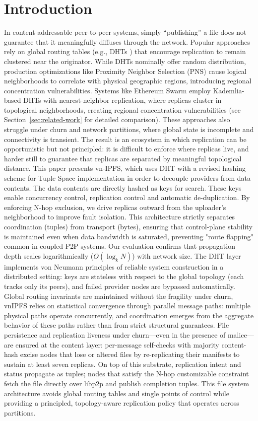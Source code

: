 \documentclass[runningheads]{llncs}
\begin{document}
\section{Introduction}
In content-addressable peer-to-peer systems, simply ``publishing'' a file does not guarantee that it meaningfully diffuses through the network. Popular approaches rely on global routing tables (e.g., DHTs \cite{StoicaChord01}) that encourage replication to remain clustered near the originator. While DHTs nominally offer random distribution, production optimizations like Proximity Neighbor Selection (PNS) cause logical neighborhoods to correlate with physical geographic regions, introducing regional concentration vulnerabilities. Systems like Ethereum Swarm employ Kademlia-based DHTs with nearest-neighbor replication, where replicas cluster in topological neighborhoods, creating regional concentration vulnerabilities (see Section~\ref{sec:related-work} for detailed comparison). These approaches also struggle under churn and network partitions, where global state is incomplete and connectivity is transient. The result is an ecosystem in which replication can be opportunistic but not principled: it is difficult to enforce where replicas live, and harder still to guarantee that replicas are separated by meaningful topological distance.
This paper presents vn-IPFS, which uses DHT with a revised hashing scheme for Tuple Space implementation in order to decouple providers from data contents. The data contents are directly hashed as keys for search. These keys enable concurrency control, replication control and automatic de-duplication. By enforcing N-hop exclusion, we drive replicas outward from the uploader's neighborhood to improve fault isolation. This architecture strictly separates coordination (tuples) from transport (bytes), ensuring that control-plane stability is maintained even when data bandwidth is saturated, preventing "route flapping" common in coupled P2P systems. Our evaluation confirms that propagation depth scales logarithmically ($O(\log_k N)$) with network size.
The DHT layer implements von Neumann principles of reliable system construction in a distributed setting: keys are stateless with respect to the global topology (each tracks only its peers), and failed provider nodes are bypassed automatically. Global routing invariants are maintained without the fragility under churn, vnIPFS relies on statistical convergence through parallel message paths: multiple physical paths operate concurrently, and coordination emerges from the aggregate behavior of these paths rather than from strict structural guarantees. File persistence and replication liveness under churn—even in the presence of malice—are ensured at the content layer: per-message self-checks with majority content-hash excise nodes that lose or altered files by re-replicating their manifests to sustain at least seven replicas. On top of this substrate, replication intent and status propagate as tuples; nodes that satisfy the N-hop customizable constraint fetch the file directly over libp2p and publish completion tuples. This file system architecture avoids global routing tables and single points of control while providing a principled, topology-aware replication policy that operates across partitions.
\end{document}
